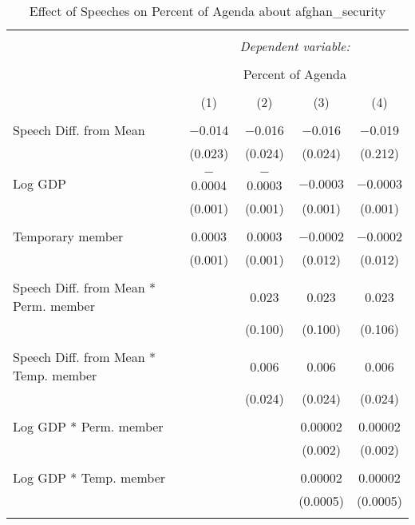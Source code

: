 
\begin{table}[!htbp] \centering 
  \caption{Effect of Speeches on Percent of Agenda about afghan_security} 
  \label{} 
\begin{tabular}{@{\extracolsep{5pt}}lcccc} 
\\[-1.8ex]\hline 
\hline \\[-1.8ex] 
 & \multicolumn{4}{c}{\textit{Dependent variable:}} \\ 
\cline{2-5} 
\\[-1.8ex] & \multicolumn{4}{c}{Percent of Agenda} \\ 
\\[-1.8ex] & (1) & (2) & (3) & (4)\\ 
\hline \\[-1.8ex] 
 Speech Diff. from Mean & $-$0.014 & $-$0.016 & $-$0.016 & $-$0.019 \\ 
  & (0.023) & (0.024) & (0.024) & (0.212) \\ 
  & & & & \\ 
 Log GDP & $-$0.0004 & $-$0.0003 & $-$0.0003 & $-$0.0003 \\ 
  & (0.001) & (0.001) & (0.001) & (0.001) \\ 
  & & & & \\ 
 Temporary member & 0.0003 & 0.0003 & $-$0.0002 & $-$0.0002 \\ 
  & (0.001) & (0.001) & (0.012) & (0.012) \\ 
  & & & & \\ 
 Speech Diff. from Mean * Perm. member &  & 0.023 & 0.023 & 0.023 \\ 
  &  & (0.100) & (0.100) & (0.106) \\ 
  & & & & \\ 
 Speech Diff. from Mean * Temp. member &  & 0.006 & 0.006 & 0.006 \\ 
  &  & (0.024) & (0.024) & (0.024) \\ 
  & & & & \\ 
 Log GDP * Perm. member &  &  & 0.00002 & 0.00002 \\ 
  &  &  & (0.002) & (0.002) \\ 
  & & & & \\ 
 Log GDP * Temp. member &  &  & 0.00002 & 0.00002 \\ 
  &  &  & (0.0005) & (0.0005) \\ 
  & & & & \\ 

\end{tabular}
\end{table}

